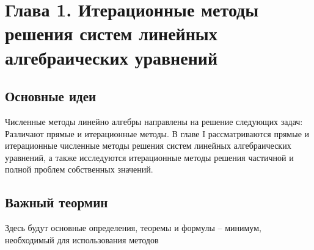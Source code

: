 \newpage
{}
\pagestyle{empty}
\vspace{0.5cm}

\section{Глава 1. Итерационные методы решения систем линейных алгебраических уравнений}

\subsection{Основные идеи}
Численные методы линейно алгебры направлены на решение следующих задач: {}
Различают прямые и итерационные методы.
В главе I рассматриваются прямые и итерационные
численные методы решения систем линейных алгебраических уравнений, а также исследуются итерационные методы решения частичной и полной проблем собственных значений.

\subsection{Важный теормин}
Здесь будут основные определения, теоремы и формулы -- минимум, необходимый для использования методов